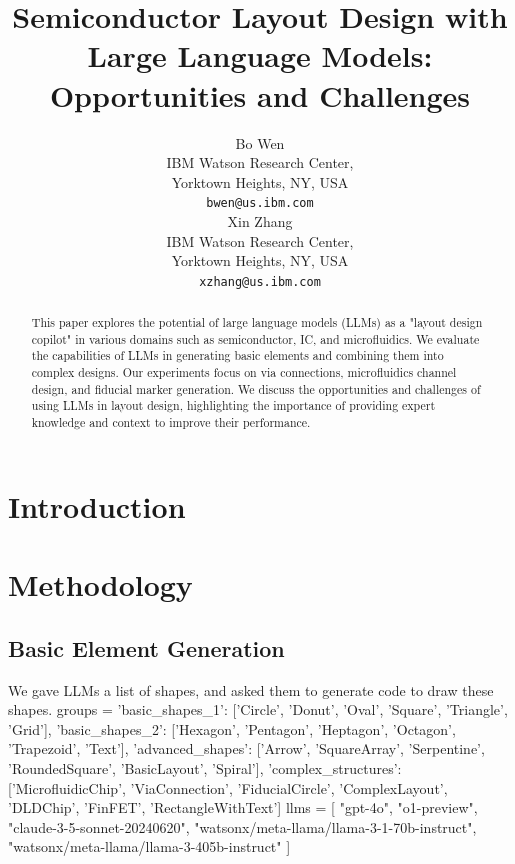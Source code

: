 \documentclass{article}
\title{Semiconductor Layout Design with Large Language Models: Opportunities and Challenges}
\author{%
  Bo Wen\\
  IBM Watson Research Center, \\
  Yorktown Heights, NY, USA \\
  \texttt{bwen@us.ibm.com} \\
  \And
  Xin Zhang\\
  IBM Watson Research Center, \\
  Yorktown Heights, NY, USA \\
  \texttt{xzhang@us.ibm.com} \\
}
\begin{document}
\maketitle

\begin{abstract}
  This paper explores the potential of large language models (LLMs) as a "layout design copilot" in various domains such as semiconductor, IC, and microfluidics. We evaluate the capabilities of LLMs in generating basic elements and combining them into complex designs. Our experiments focus on via connections, microfluidics channel design, and fiducial marker generation. We discuss the opportunities and challenges of using LLMs in layout design, highlighting the importance of providing expert knowledge and context to improve their performance.
\end{abstract}

\section{Introduction}

\section{Methodology}
\subsection{Basic Element Generation}

We gave LLMs a list of shapes, and asked them to generate code to draw these shapes.
groups = {
  'basic_shapes_1': ['Circle', 'Donut', 'Oval', 'Square', 'Triangle', 'Grid'],
  'basic_shapes_2': ['Hexagon', 'Pentagon', 'Heptagon', 'Octagon', 'Trapezoid', 'Text'],
  'advanced_shapes': ['Arrow', 'SquareArray', 'Serpentine', 'RoundedSquare', 'BasicLayout', 'Spiral'],
  'complex_structures': ['MicrofluidicChip', 'ViaConnection', 'FiducialCircle', 'ComplexLayout',
                         'DLDChip', 'FinFET', 'RectangleWithText']
}
llms = [
  "gpt-4o",
  "o1-preview",
  "claude-3-5-sonnet-20240620",
  "watsonx/meta-llama/llama-3-1-70b-instruct",
  "watsonx/meta-llama/llama-3-405b-instruct"
]
\end{document}

